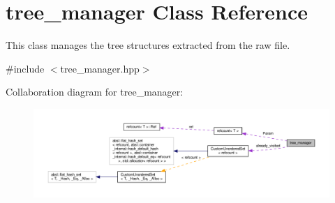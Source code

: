 \hypertarget{classtree__manager}{}\section{tree\+\_\+manager Class Reference}
\label{classtree__manager}


This class manages the tree structures extracted from the raw file.  




{\ttfamily \#include $<$tree\+\_\+manager.\+hpp$>$}



Collaboration diagram for tree\+\_\+manager\+:
\nopagebreak
\begin{figure}[H]
\begin{center}
\leavevmode
\includegraphics[width=350pt]{d7/da1/classtree__manager__coll__graph}
\end{center}
\end{figure}
